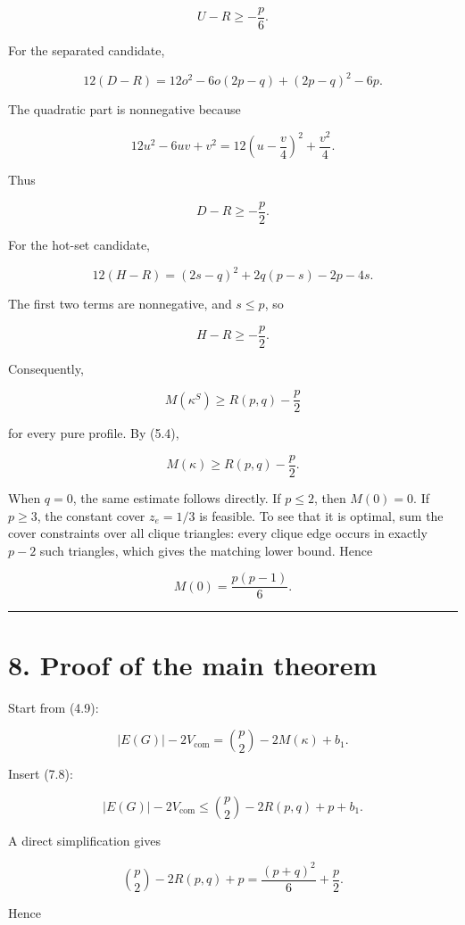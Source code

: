 \documentclass[
  11pt,
]{article}
\begin{document}
\[
U-R\ge-\frac p6.
\tag{7.3}
\]

For the separated candidate,

\[
12(D-R)
=
12o^2-6o(2p-q)+(2p-q)^2-6p.
\tag{7.4}
\]

The quadratic part is nonnegative because

\[
12u^2-6uv+v^2
=
12\left(u-\frac v4\right)^2+\frac{v^2}{4}.
\]

Thus

\[
D-R\ge-\frac p2.
\tag{7.5}
\]

For the hot-set candidate,

\[
12(H-R)
=
(2s-q)^2+2q(p-s)-2p-4s.
\tag{7.6}
\]

The first two terms are nonnegative, and \(s\le p\), so

\[
H-R\ge-\frac p2.
\tag{7.7}
\]

Consequently,

\[
M(\kappa^S)
\ge
R(p,q)-\frac p2
\]

for every pure profile. By (5.4),

\[
\boxed{
M(\kappa)
\ge
R(p,q)-\frac p2.
}
\tag{7.8}
\]

When \(q=0\), the same estimate follows directly. If \(p\le2\), then
\(M(0)=0\). If \(p\ge3\), the constant cover \(z_e=1/3\) is feasible. To
see that it is optimal, sum the cover constraints over all clique
triangles: every clique edge occurs in exactly \(p-2\) such triangles,
which gives the matching lower bound. Hence

\[
M(0)=\frac{p(p-1)}6.
\]

\begin{center}\rule{0.5\linewidth}{0.5pt}\end{center}

\section{8. Proof of the main theorem}\label{proof-of-the-main-theorem}

Start from (4.9):

\[
|E(G)|-2V_{\mathrm{com}}
=
\binom p2-2M(\kappa)+b_1.
\]

Insert (7.8):

\[
|E(G)|-2V_{\mathrm{com}}
\le
\binom p2-2R(p,q)+p+b_1.
\tag{8.1}
\]

A direct simplification gives

\[
\binom p2-2R(p,q)+p
=
\frac{(p+q)^2}{6}+\frac p2.
\tag{8.2}
\]

Hence
\end{document}
